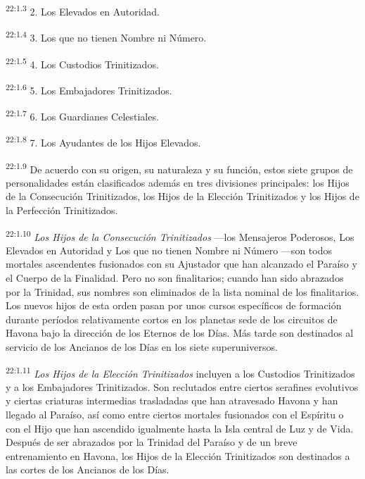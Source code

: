 \par
\textsuperscript{22:1.3} 2. Los Elevados en Autoridad.

\par
\textsuperscript{22:1.4} 3. Los que no tienen Nombre ni Número.

\par
\textsuperscript{22:1.5} 4. Los Custodios Trinitizados.

\par
\textsuperscript{22:1.6} 5. Los Embajadores Trinitizados.

\par
\textsuperscript{22:1.7} 6. Los Guardianes Celestiales.

\par
\textsuperscript{22:1.8} 7. Los Ayudantes de los Hijos Elevados.

\par
\textsuperscript{22:1.9} De acuerdo con su origen, su naturaleza y su función, estos siete grupos de personalidades están clasificados además en tres divisiones principales: los Hijos de la Consecución Trinitizados, los Hijos de la Elección Trinitizados y los Hijos de la Perfección Trinitizados.

\par
\textsuperscript{22:1.10} \textit{Los Hijos de la Consecución Trinitizados} ---los Mensajeros Poderosos, Los Elevados en Autoridad y Los que no tienen Nombre ni Número ---son todos mortales ascendentes fusionados con su Ajustador que han alcanzado el Paraíso y el Cuerpo de la Finalidad. Pero no son finalitarios; cuando han sido abrazados por la Trinidad, sus nombres son eliminados de la lista nominal de los finalitarios. Los nuevos hijos de esta orden pasan por unos cursos específicos de formación durante períodos relativamente cortos en los planetas sede de los circuitos de Havona bajo la dirección de los Eternos de los Días. Más tarde son destinados al servicio de los Ancianos de los Días en los siete superuniversos.

\par
\textsuperscript{22:1.11} \textit{Los Hijos de la Elección Trinitizados} incluyen a los Custodios Trinitizados y a los Embajadores Trinitizados. Son reclutados entre ciertos serafines evolutivos y ciertas criaturas intermedias trasladadas que han atravesado Havona y han llegado al Paraíso, así como entre ciertos mortales fusionados con el Espíritu o con el Hijo que han ascendido igualmente hasta la Isla central de Luz y de Vida. Después de ser abrazados por la Trinidad del Paraíso y de un breve entrenamiento en Havona, los Hijos de la Elección Trinitizados son destinados a las cortes de los Ancianos de los Días.

